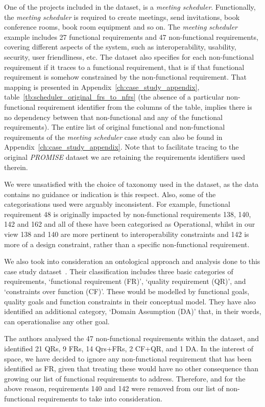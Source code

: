 \documentclass[dissertation,final]{softeng}
\newcommand{\nfrs}{non-functional requirements\xspace}
\begin{document}
One of the projects included in the dataset, is a \emph{meeting scheduler}. Functionally, the \emph{meeting scheduler} is required to create meetings, send invitations, book conference rooms, book room equipment and so on. The \emph{meeting scheduler} example includes 27 functional requirements and 47 \nfrs, covering different aspects of the system, such as interoperability, usability, security, user friendliness, etc. The dataset also specifies for each non-functional requirement if it traces to a functional requirement, that is if that functional requirement is somehow constrained by the non-functional requirement. That mapping is presented in Appendix~\ref{ch:case_study_appendix}, table~\ref{tb:scheduler_original_frs_to_nfrs} (the absence of a particular non-functional requirement identifier from the columns of the table, implies there is no dependency between that non-functional and any of the functional requirements). The entire list of original functional and non-functional requirements of the \emph{meeting scheduler} case study can also be found in Appendix~\ref{ch:case_study_appendix}. Note that to facilitate tracing to the original \emph{PROMISE} dataset we are retaining the requirements identifiers used therein.

We were unsatisfied with the choice of taxonomy used in the dataset, as the data contains no guidance or indication is this respect. Also, some of the categorisations used were arguably inconsistent. For example, functional requirement 48 is originally impacted by non-functional requirements 138, 140, 142 and 162 and all of these have been categorised as Operational, whilst in our view 138 and 140 are more pertinent to interoperability constraints and 142 is more of a design constraint, rather than a specific non-functional requirement.

We also took into consideration an ontological approach and analysis done to this case study dataset~\citep{MylopoulosOnt2014}. Their classification includes three basic categories of requirements, `functional requirement (FR)', `quality requirement (QR)', and `constraints over function (CF)'. These would be modelled by functional goals, quality goals and function constraints in their conceptual model. They have also identified an additional category, `Domain Assumption (DA)' that, in their words, can operationalise any other goal.

The authors analysed the 47 \nfrs within the dataset, and identified 21 QRs, 9 FRs, 14 Qrs+FRs, 2 CF+QR, and 1 DA. In the interest of space, we have decided to ignore any non-functional requirement that has been identified as FR, given that treating these would have no other consequence than growing our list of functional requirements to address. Therefore, and for the above reason, requirements 140 and 142 were removed from our list of \nfrs to take into consideration.
\end{document}

